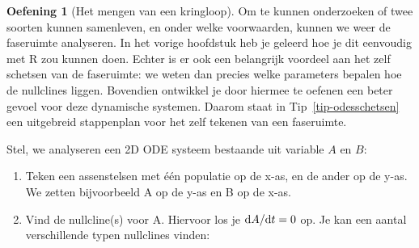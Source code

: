 \documentclass[
  a4paper,
]{scrbook}
\providecommand{\tightlist}{%
  \setlength{\itemsep}{0pt}\setlength{\parskip}{0pt}}\usepackage{longtable,booktabs,array}
\theoremstyle{definition}
\newtheorem{exercise}{Oefening}[chapter]
\theoremstyle{remark}
\newcounter{quartocallouttipno}
\newcommand{\quartocallouttip}[1]{\refstepcounter{quartocallouttipno}\label{#1}}
\begin{document}
\begin{exercise}[Het mengen van een
kringloop]
Om te kunnen onderzoeken of twee soorten kunnen samenleven, en onder
welke voorwaarden, kunnen we weer de faseruimte analyseren. In het
vorige hoofdstuk heb je geleerd hoe je dit eenvoudig met R zou kunnen
doen. Echter is er ook een belangrijk voordeel aan het zelf schetsen van
de faseruimte: we weten dan precies welke parameters bepalen hoe de
nullclines liggen. Bovendien ontwikkel je door hiermee te oefenen een
beter gevoel voor deze dynamische systemen. Daarom staat in
Tip~\ref{tip-odesschetsen} een uitgebreid stappenplan voor het zelf
tekenen van een faseruimte.

\begin{tcolorbox}[enhanced jigsaw, rightrule=.15mm, opacityback=0, leftrule=.75mm, title=\textcolor{quarto-callout-tip-color}{\faLightbulb}\hspace{0.5em}{Tip \ref*{tip-odesschetsen}: Algemeen stappenplan voor het schetsen van faseruimtes.}, toptitle=1mm, titlerule=0mm, opacitybacktitle=0.6, colframe=quarto-callout-tip-color-frame, breakable, colbacktitle=quarto-callout-tip-color!10!white, coltitle=black, toprule=.15mm, bottomrule=.15mm, left=2mm, bottomtitle=1mm, arc=.35mm, colback=white]

\quartocallouttip{tip-odesschetsen} 

Stel, we analyseren een 2D ODE systeem bestaande uit variable \(A\) en
\(B\):

\begin{enumerate}
\def\labelenumi{\arabic{enumi}.}
\tightlist
\item
  Teken een assenstelsen met één populatie op de x-as, en de ander op de
  y-as. We zetten bijvoorbeeld A op de y-as en B op de x-as.
\item
  Vind de nullcline(s) voor A. Hiervoor los je
  \(\mathchoice{\frac{\mathrm{d}A}
  {\mathrm{d}t}}{\mathrm{d}A/\mathrm{d}t}
  {\mathrm{d}A/\mathrm{d}t}
  {\mathrm{d}A/\mathrm{d}t}=0\) op. Je kan een aantal verschillende
  typen nullclines vinden:


\end{enumerate}
\end{tcolorbox}
\end{exercise}
\end{document}
